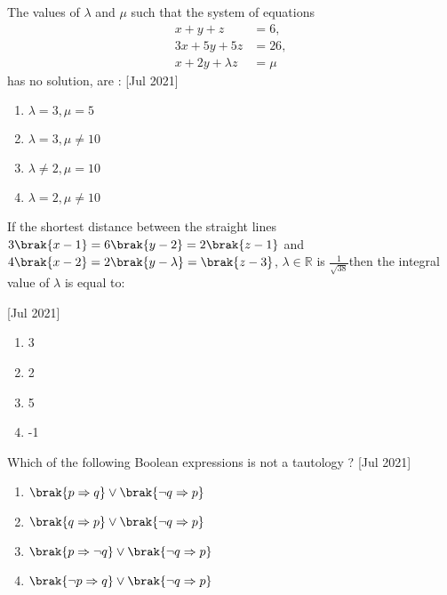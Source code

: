     \item{
            The values of $\lambda$ and $\mu$ such that the system of equations 
            \begin{align*}
            	x+y+z &= 6, \\
            	3x+5y+5z &= 26, \\
            	x + 2y + \lambda z &= \mu
            \end{align*}
            has no solution, are : \text{ }
             \hfill
                {[Jul 2021]}
            \begin{multicols}{4}
                \begin{enumerate}
                	\item $\lambda = 3, \mu = 5$
                    \item $\lambda = 3, \mu \neq 10$
                    \item $\lambda \neq 2, \mu = 10$
                    \item $\lambda = 2, \mu \neq 10$
                \end{enumerate}
            \end{multicols}

        
        }
    \item{
            If the shortest distance between the straight lines $3\brak{x-1}=6\brak{y-2}=2\brak{z-1}$ and $4\brak{x-2}=2\brak{y-\lambda}=\brak{z-3}$, $\lambda \in \mathbb{R}$ is $\frac{1}{\sqrt{38}}$then the integral value of $\lambda$ is equal to:
            
             \hfill
                {[Jul 2021]}
            \begin{multicols}{4}
                \begin{enumerate}
                	\item 3
                	\item 2
                	\item 5
                	\item -1
                \end{enumerate}
            \end{multicols}
        
        }
    \item{
            Which of the following Boolean expressions is not a tautology ?
             \hfill
                {[Jul 2021]}
			\begin{multicols}{2}
				\begin{enumerate}
					\item $\brak{p \Rightarrow q} \lor \brak{\neg q \Rightarrow p}$
					\item $\brak{q \Rightarrow p} \lor \brak{\neg q \Rightarrow p}$
					\item $\brak{p \Rightarrow \neg q} \lor \brak{\neg q \Rightarrow p}$
					\item $\brak{\neg p \Rightarrow q} \lor \brak{\neg q \Rightarrow p}$
				\end{enumerate}
			\end{multicols}
        
        }
